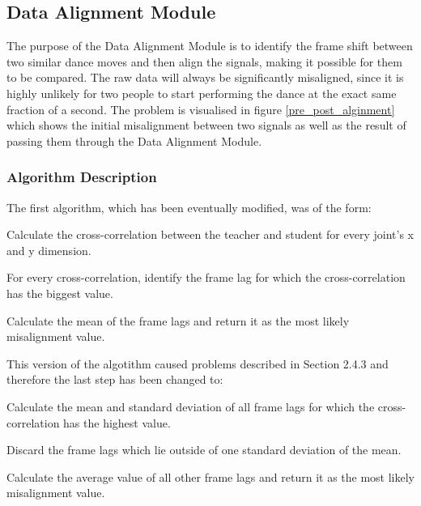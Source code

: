 \documentclass[10pt,a4paper]{article}
\begin{document}
\clearpage
\subsection{Data Alignment Module}
\noindent
The purpose of the Data Alignment Module is to identify the frame shift between two similar dance moves and then align the signals, making it possible for them to be compared. The raw data will always be significantly misaligned, since it is highly unlikely for two people to start performing the dance at the exact same fraction of a second. The problem is visualised in figure \ref{pre_post_alginment} which shows the initial misalignment between two signals as well as the result of passing them through the Data Alignment Module.

\subsubsection{Algorithm Description}
\noindent
The first algorithm, which has been eventually modified, was of the form:
\begin{compactitem}
\setlength{\itemsep}{1pt}
\setlength{\parskip}{0pt}
\setlength{\parsep}{0pt}
	\item Calculate the cross-correlation between the teacher and student for every joint's x and y dimension.
	\item For every cross-correlation, identify the frame lag for which the cross-correlation has the biggest value.
	\item Calculate the mean of the frame lags and return it as the most likely misalignment value.
\end{compactitem}
This version of the algotithm caused problems described in Section 2.4.3 and therefore the last step has been changed to:
\begin{compactitem}
\setlength{\itemsep}{1pt}
\setlength{\parskip}{0pt}
\setlength{\parsep}{0pt}
	\item Calculate the mean and standard deviation of all frame lags for which the cross-correlation has the highest value.
	\item Discard the frame lags which lie outside of one standard deviation of the mean.
	\item Calculate the average value of all other frame lags and return it as the most likely misalignment value.
\end{compactitem}
\end{document}
